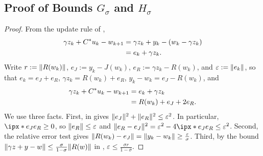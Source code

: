 \documentclass[11pt]{article}
\begin{document}
\subsection{Proof of Bounds \texorpdfstring{$G_{\sigma}$}{G\_sigma} and \texorpdfstring{$H_{\sigma}$}{H\_sigma}}
\begin{proof}
    From the update rule of ,
    \begin{align}
        \gamma z_k + {C}^* u_k - w_{k+1} &= \gamma z_k + y_k - (w_{k} - \gamma z_k) \\
        &= e_k + \gamma z_k.
    \end{align}
    Write $r := \lVert R(w_k)\rVert$, $e_J := y_k - J(w_k)$, $e_R := \gamma z_k - R(w_k)$, and $\varepsilon := \lVert e_k\rVert$, so that $e_k = e_J + e_R$, $\gamma z_k = R(w_k) + e_R$, $y_k - w_k = e_J - R(w_k)$, and
    \begin{align}
        \gamma z_k + {C}^* u_k - w_{k+1} &= e_k + \gamma z_k \\
        &= R(w_k) + e_J + 2e_R.
    \end{align}
    We use three facts.
    First,  in  gives $\lVert e_J\rVert^2 + \lVert e_R\rVert^2\leq\varepsilon^2$.
    In particular, $\ip{e_J}{e_R}\geq0$, so $\lVert e_R\rVert\leq\varepsilon$ and $\norm{e_R - e_J}^2 = \varepsilon^2 - 4\ip{e_J}{e_R}\leq\varepsilon^2$.
    Second, the relative error test gives $\lVert R(w_k) - e_J\rVert = \lVert y_k - w_k\rVert\geq\frac{\varepsilon}{\sigma}$.
    Third, by the bound $\lVert\gamma z + y - w\rVert \leq \frac{\sigma}{1-\sigma}\lVert R(w)\rVert$  in , $\varepsilon\leq\frac{\sigma r}{1-\sigma}$.


\end{proof}
\end{document}
